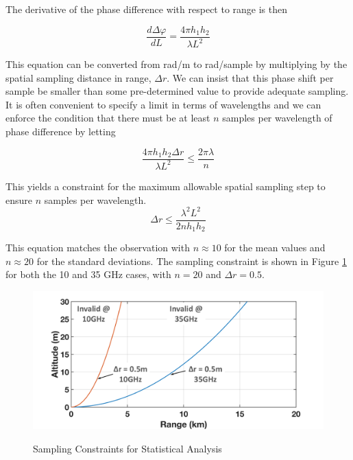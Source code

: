 The derivative of the phase difference with respect to range is then

\begin{equation}
\frac{d\Delta\varphi}{dL}=\frac{4\pi h_1h_2}{\lambda L^2}
\label{stat_eq:2}
\end{equation}
\renewcommand{\baselinestretch}{2} \small\normalsize

\noindent This equation can be converted from rad/m to rad/sample by multiplying by the spatial sampling distance in range, $\Delta r$. We can insist that this phase shift per sample be smaller than some pre-determined value to provide adequate sampling. It is often convenient to specify a limit in terms of wavelengths and we can enforce the condition that there must be at least $n$ samples per wavelength of phase difference by letting

\begin{equation}
\frac{4\pi h_1h_2\Delta r}{\lambda L^2} \leq \frac{2\pi \lambda}{n}
\label{stat_eq:3}
\end{equation}

This yields a constraint for the maximum allowable spatial sampling step to ensure $n$ samples per wavelength.
\begin{equation}
\boxed{\Delta r \leq \frac{\lambda^2 L^2}{2nh_1h_2}}
\label{stat_eq:4}
\end{equation}

This equation matches the observation with $n\approx 10$ for the mean values and $n\approx 20$ for the standard deviations. The sampling constraint is shown in Figure \ref{stat_fig:3} for both the 10 and 35 GHz cases, with $n = 20$ and $\Delta r = 0.5$.

\begin{figure}[H]
  \begin{center}
\includegraphics[width=5in]{../media/statistics/sampling_constraint.png}
  \end{center}
  \renewcommand{\baselinestretch}{1} \small\normalsize
  \begin{quote}
    \caption[Sampling Constraints for Statistical Analysis]{Sampling Constraints for Statistical Analysis\label{stat_fig:3}}
  \end{quote}
\end{figure}
\renewcommand{\baselinestretch}{2} \small\normalsize

